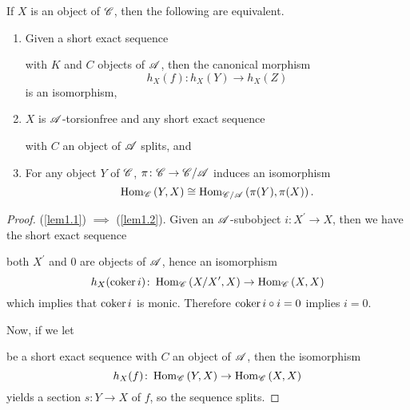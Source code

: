 \documentclass[dissertation.tex]{subfiles}
\begin{document}
\begin{lem}\label{lem1}
  If $X$ is an object of $\mathscr{C}$, then the following are equivalent.
  \begin{enumerate}
  \item\label{lem1.1}
    Given a short exact sequence 
    \begin{center}
    \end{center}
    with $K$ and $C$ objects of $\mathscr{A}$, then the canonical morphism
    $$h_X(f) \colon h_X(Y) \rightarrow h_X(Z)$$
    is an isomorphism,
  \item\label{lem1.2}
    $X$ is $\mathscr{A}$-torsionfree and 
    any short exact sequence 
    \begin{center}
    \end{center}
    with $C$ an object of $\mathscr{A}$ splits, and
  \item\label{lem1.3}
    For any object $Y$ of $\mathscr{C}$, $\pi \colon \mathscr{C} \rightarrow \mathscr{C}/\mathscr{A}$ induces an isomorphism
    $$\operatorname{Hom}_{\mathscr{C}}\left(Y, X\right) \cong \operatorname{Hom}_{\mathscr{C}/\mathscr{A}}\left(\pi(Y), \pi(X)\right).$$
  \end{enumerate}
  
  \begin{proof}
    (\ref{lem1.1}) $\implies$ (\ref{lem1.2}).  Given an $\mathscr{A}$-subobject $i \colon X^\prime \rightarrow X$, then we have the short exact sequence
    \begin{center}
    \end{center}
    both $X^\prime$ and $0$ are objects of $\mathscr{A}$, hence an isomorphism
    $$h_X(\operatorname{coker}{i}) \colon \operatorname{Hom}_{\mathscr{C}}\left(X/X^\prime, X\right) \rightarrow \operatorname{Hom}_{\mathscr{C}}\left(X,X\right)$$
    which implies that $\operatorname{coker}{i}$ is monic.
    Therefore $\operatorname{coker}{i} \circ i = 0$ implies $i = 0$.

    Now, if we let 
    \begin{center}
    \end{center}
    be a short exact sequence with $C$ an object of $\mathscr{A}$, then the isomorphism
    $$h_X(f) \colon \operatorname{Hom}_{\mathscr{C}}\left(Y,X\right) \rightarrow \operatorname{Hom}_{\mathscr{C}}\left(X,X\right)$$
    yields a section $s \colon Y \rightarrow X$ of $f$, so the sequence splits.


\end{proof}
\end{lem}
\end{document}
